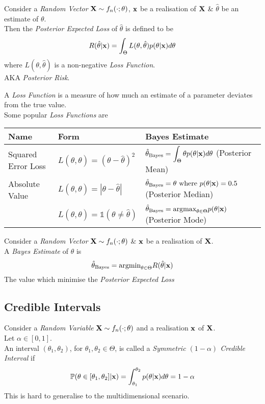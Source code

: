 \documentclass[11pt,a4paper]{article}
\begin{document}
Consider a \textit{Random Vector} $\textbf{X}\sim f_n(\cdot;\theta)$, $\textbf{x}$ be a realisation of $\textbf{X}$ \& $\hat\theta$ be an estimate of $\theta$.\\
Then the \textit{Posterior Expected Loss} of $\hat\theta$ is defined to be
$$R(\hat\theta|\textbf{x})=\int_\Theta L(\theta,\hat\theta)p(\theta|\textbf{x})d\theta$$
where $L(\theta,\hat\theta)$ is a non-negative \textit{Loss Function}.\\
\nb AKA \textit{Posterior Risk}.

A \textit{Loss Function} is a measure of how much an estimate of a parameter deviates from the true value.\\
Some popular \textit{Loss Functions} are
\begin{center}\begin{tabular}{|l|l|l|}
\hline
\textbf{Name}&\textbf{Form}&\textbf{Bayes Estimate}\\
\hline
Squared Error Loss&$L(\theta,\hat\theta)=(\theta-\hat\theta)^2$&$\hat\theta_\text{Bayes}=\displaystyle\int_\Theta\theta p(\theta|\textbf{x})d\theta$  (Posterior Mean)\\
Absolute Value&$L(\theta,\hat\theta)=|\theta-\hat\theta|$&$\hat\theta_\text{Bayes}=\theta\text{ where }p(\theta|\textbf{x})=0.5$ (Posterior Median)\\
&$L(\theta,\hat\theta)=\mathds{1}(\theta\neq\hat\theta)$&$\hat\theta_\text{Bayes}=\text{argmax}_{\theta\in\Theta}p(\theta|\textbf{x})$ (Posterior Mode)\\
\hline
\end{tabular}\end{center}

Consider a \textit{Random Vector} $\textbf{X}\sim f_n(\cdot;\theta)$ \& $\textbf{x}$ be a realisation of $\textbf{X}$.\\
A \textit{Bayes Estimate} of $\theta$ is 
$$\hat\theta_\text{Bayes}=\text{argmin}_{\theta\in\Theta}R(\hat\theta|\textbf{x})$$
\ie The value which minimise the \textit{Posterior Expected Loss}

\subsection{Credible Intervals}

Consider a \textit{Random Variable} $\textbf{X}\sim f_n(\cdot;\theta)$ and a realisation $\textbf{x}$ of $\textbf{X}$.\\
Let $\alpha\in[0,1]$.\\
An interval $(\theta_1,\theta_2)$, for $\theta_1,\theta_2\in\Theta$, is called a \textit{Symmetric $(1-\alpha)$ Credible Interval} if
$$\mathbb{P}(\theta\in[\theta_1,\theta_2]|\textbf{x})=\int_{\theta_1}^{\theta_2}p(\theta|\textbf{x})d\theta=1-\alpha$$
\nb This is hard to generalise to the multidimensional scenario.\\
\end{document}
